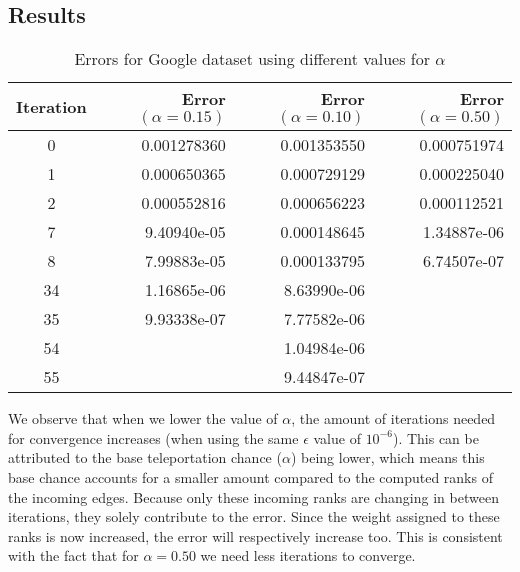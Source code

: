 \documentclass{article}
\begin{document}
\subsection{Results}

\begin{table}[H]
    \centering
    \begin{tabular}{ | c | r | r | r |}
        \hline
        \textbf{Iteration} & Error $(\alpha = 0.15)$ & Error $(\alpha = 0.10)$ & Error $(\alpha = 0.50)$ \\ \hline
        0   & 0.001278360   & 0.001353550 & 0.000751974 \\ \hline
        1   & 0.000650365   & 0.000729129 & 0.000225040 \\ \hline
        2   & 0.000552816   & 0.000656223 & 0.000112521 \\ \hline \hline
        7   & 9.40940e-05   & 0.000148645 & 1.34887e-06 \\ \hline
        8   & 7.99883e-05   & 0.000133795 & 6.74507e-07 \\ \hline \hline
       34   & 1.16865e-06   & 8.63990e-06 &             \\ \hline
       35   & 9.93338e-07   & 7.77582e-06 &             \\ \hline \hline
       54   &               & 1.04984e-06 &             \\ \hline
       55   &               & 9.44847e-07 &             \\ \hline
    \end{tabular}
    \caption{Errors for Google dataset using different values for $\alpha$}
    \label{tab:my_label}
\end{table}
We observe that when we lower the value of $\alpha$, the amount of iterations needed for convergence increases (when using the same $\epsilon$ value of $10^{-6}$). This can be attributed to the base teleportation chance ($\alpha$) being lower, which means this base chance accounts for a smaller amount compared to the computed ranks of the incoming edges. Because only these incoming ranks are changing in between iterations, they solely contribute to the error. Since the weight assigned to these ranks is now increased, the error will respectively increase too. This is consistent with the fact that for $\alpha = 0.50$ we need less iterations to converge.
\end{document}
